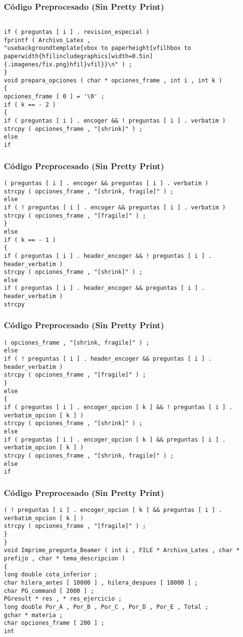 \documentclass{beamer}
\begin{document}
\begin{frame}[fragile]
\frametitle{C\'odigo Preprocesado (Sin Pretty Print)}
\begin{lstlisting}[style=CStyle]

if ( preguntas [ i ] . revision_especial ) 
fprintf ( Archivo_Latex , 
"usebackgroundtemplate{vbox to paperheight{vfilhbox to paperwidth{hfilincludegraphics[width=0.5in]{.imagenes/fix.png}hfil}vfil}}\n" ) ; 
} 
void prepara_opciones ( char * opciones_frame , int i , int k ) 
{ 
opciones_frame [ 0 ] = '\0' ; 
if ( k == - 2 ) 
{ 
if ( preguntas [ i ] . encoger && ! preguntas [ i ] . verbatim ) 
strcpy ( opciones_frame , "[shrink]" ) ; 
else 
if \end{lstlisting}
\end{frame}
\begin{frame}[fragile]
\frametitle{C\'odigo Preprocesado (Sin Pretty Print)}
\begin{lstlisting}[style=CStyle]
( preguntas [ i ] . encoger && preguntas [ i ] . verbatim ) 
strcpy ( opciones_frame , "[shrink, fragile]" ) ; 
else 
if ( ! preguntas [ i ] . encoger && preguntas [ i ] . verbatim ) 
strcpy ( opciones_frame , "[fragile]" ) ; 
} 
else 
if ( k == - 1 ) 
{ 
if ( preguntas [ i ] . header_encoger && ! preguntas [ i ] . header_verbatim ) 
strcpy ( opciones_frame , "[shrink]" ) ; 
else 
if ( preguntas [ i ] . header_encoger && preguntas [ i ] . header_verbatim ) 
strcpy \end{lstlisting}
\end{frame}
\begin{frame}[fragile]
\frametitle{C\'odigo Preprocesado (Sin Pretty Print)}
\begin{lstlisting}[style=CStyle]
( opciones_frame , "[shrink, fragile]" ) ; 
else 
if ( ! preguntas [ i ] . header_encoger && preguntas [ i ] . header_verbatim ) 
strcpy ( opciones_frame , "[fragile]" ) ; 
} 
else 
{ 
if ( preguntas [ i ] . encoger_opcion [ k ] && ! preguntas [ i ] . verbatim_opcion [ k ] ) 
strcpy ( opciones_frame , "[shrink]" ) ; 
else 
if ( preguntas [ i ] . encoger_opcion [ k ] && preguntas [ i ] . verbatim_opcion [ k ] ) 
strcpy ( opciones_frame , "[shrink, fragile]" ) ; 
else 
if \end{lstlisting}
\end{frame}
\begin{frame}[fragile]
\frametitle{C\'odigo Preprocesado (Sin Pretty Print)}
\begin{lstlisting}[style=CStyle]
( ! preguntas [ i ] . encoger_opcion [ k ] && preguntas [ i ] . verbatim_opcion [ k ] ) 
strcpy ( opciones_frame , "[fragile]" ) ; 
} 
} 
void Imprime_pregunta_Beamer ( int i , FILE * Archivo_Latex , char * prefijo , char * tema_descripcion ) 
{ 
long double cota_inferior ; 
char hilera_antes [ 10000 ] , hilera_despues [ 10000 ] ; 
char PG_command [ 2000 ] ; 
PGresult * res , * res_ejercicio ; 
long double Por_A , Por_B , Por_C , Por_D , Por_E , Total ; 
gchar * materia ; 
char opciones_frame [ 200 ] ; 
int \end{lstlisting}
\end{frame}
\end{document}
